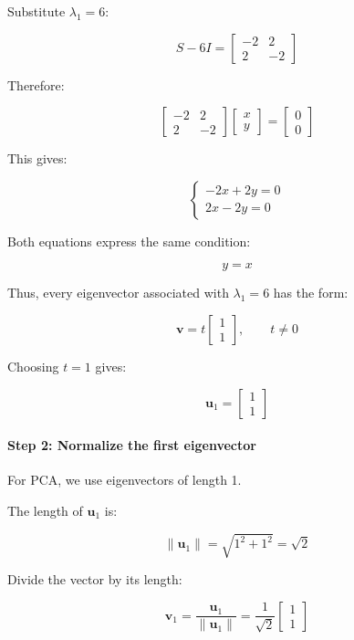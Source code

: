 \documentclass[11pt]{article}
\begin{document}
Substitute \(\lambda_1=6\):

\[
S-6I=
\begin{bmatrix}
-2 & 2\\
2 & -2
\end{bmatrix}
\]

Therefore:

\[
\begin{bmatrix}
-2 & 2\\
2 & -2
\end{bmatrix}
\begin{bmatrix}
x\\
y
\end{bmatrix}
=
\begin{bmatrix}
0\\
0
\end{bmatrix}
\]

This gives:

\[
\begin{cases}
-2x+2y=0\\
2x-2y=0
\end{cases}
\]

Both equations express the same condition:

\[
y=x
\]

Thus, every eigenvector associated with \(\lambda_1=6\) has the form:

\[
\mathbf{v}=
t\begin{bmatrix}
1\\
1
\end{bmatrix},
\qquad t\neq0
\]

Choosing \(t=1\) gives:

\[
\mathbf{u}_1=
\begin{bmatrix}
1\\
1
\end{bmatrix}
\]

\paragraph{Step 2: Normalize the first
eigenvector}\label{step-2-normalize-the-first-eigenvector}

For PCA, we use eigenvectors of length 1.

The length of \(\mathbf{u}_1\) is:

\[
\|\mathbf{u}_1\|
=
\sqrt{1^2+1^2}
=
\sqrt{2}
\]

Divide the vector by its length:

\[
\boxed{
\mathbf{v}_1
=
\frac{\mathbf{u}_1}{\|\mathbf{u}_1\|}
=
\frac{1}{\sqrt{2}}
\begin{bmatrix}
1\\
1
\end{bmatrix}
}
\]
\end{document}
